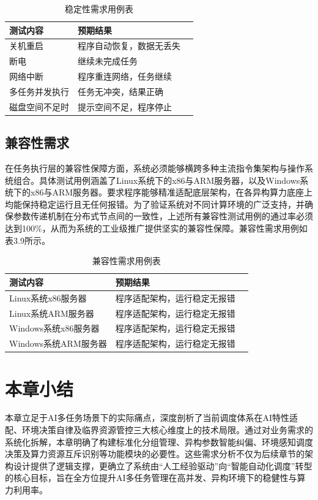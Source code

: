 \begin{table}[htbp]
\centering
\caption{稳定性需求用例表}
\begin{tabular}{lll}
\toprule
测试内容 & 预期结果\\
\midrule
关机重启 & 程序自动恢复，数据无丢失 \\
断电 & 继续未完成任务 \\
网络中断 & 程序重连网络，任务继续 \\
多任务并发执行 & 任务无冲突，结果正确 \\
磁盘空间不足时 & 提示空间不足，程序停止 \\
\bottomrule
\end{tabular}
\label{tab:my_label}
\end{table}

\subsection{兼容性需求}

在任务执行层的兼容性保障方面，系统必须能够横跨多种主流指令集架构与操作系统组合。具体测试用例涵盖了Linux系统下的x86与ARM服务器，以及Windows系统下的x86与ARM服务器。要求程序能够精准适配底层架构，在各异构算力底座上均能保持稳定运行且无任何报错。为了验证系统对不同计算环境的广泛支持，并确保参数传递机制在分布式节点间的一致性，上述所有兼容性测试用例的通过率必须达到100\%，从而为系统的工业级推广提供坚实的兼容性保障。兼容性需求用例如表3.9所示。

\begin {table}[htbp]
\centering
\caption {兼容性需求用例表}
\begin {tabular}{lll}
\toprule
测试内容 & 预期结果\\
\midrule
Linux系统x86服务器 & 程序适配架构，运行稳定无报错 \\
Linux系统ARM服务器 & 程序适配架构，运行稳定无报错 \\
Windows系统x86服务器 & 程序适配架构，运行稳定无报错 \\
Windows系统ARM服务器 & 程序适配架构，运行稳定无报错 \\
\bottomrule
\end {tabular}
\label {tab:my_label}
\end {table}

\section{本章小结}

本章立足于AI多任务场景下的实际痛点，深度剖析了当前调度体系在AI特性适配、环境决策自律及临界资源管控三大核心维度上的技术局限。通过对业务需求的系统化拆解，本章明确了构建标准化分组管理、异构参数智能纠偏、环境感知调度决策及算力资源互斥识别等功能模块的必要性。这些需求分析不仅为后续章节的架构设计提供了逻辑支撑，更确立了系统由“人工经验驱动”向“智能自动化调度”转型的核心目标，旨在全方位提升AI多任务管理在高并发、异构环境下的稳健性与算力利用率。

\makeatletter
\@openrightfalse
\makeatother